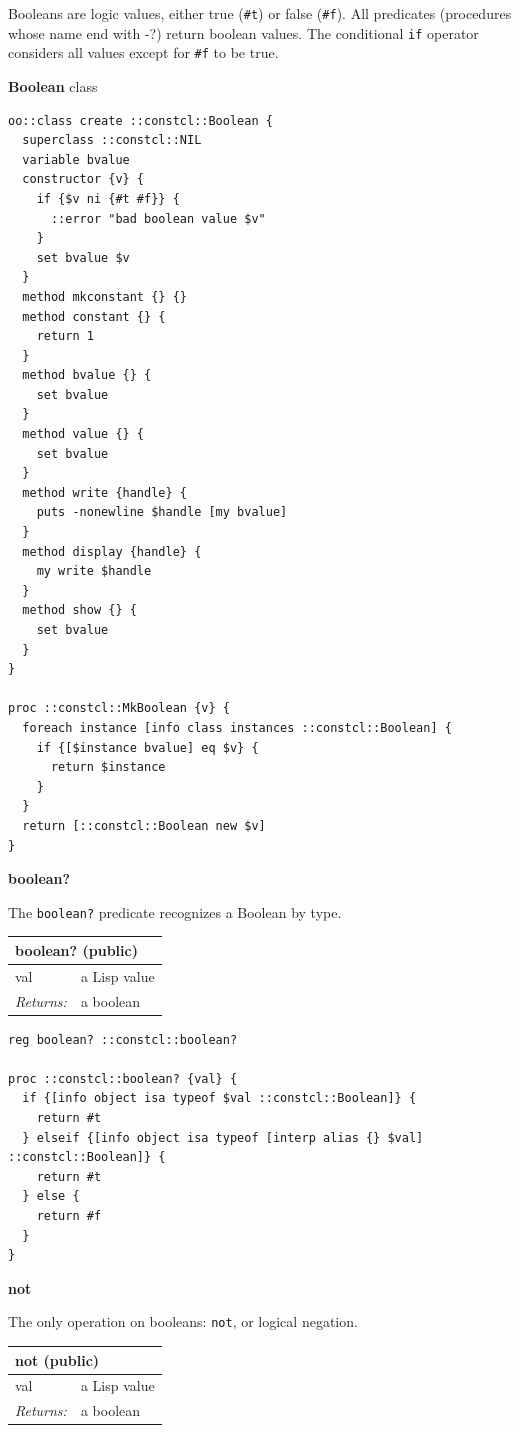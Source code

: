 \documentclass[twoside,9pt]{report}
\begin{document}
Booleans are logic values, either true (\texttt{\#t}) or false (\texttt{\#f}). All predicates (procedures whose name end with -?) return boolean values. The conditional \texttt{if} operator considers all values except for \texttt{\#f} to be true.


\textbf{Boolean} class

\noindent\makebox[\linewidth]{\rule{\linewidth}{0.4pt}}
\begin{lstlisting}
oo::class create ::constcl::Boolean {
  superclass ::constcl::NIL
  variable bvalue
  constructor {v} {
    if {$v ni {#t #f}} {
      ::error "bad boolean value $v"
    }
    set bvalue $v
  }
  method mkconstant {} {}
  method constant {} {
    return 1
  }
  method bvalue {} {
    set bvalue
  }
  method value {} {
    set bvalue
  }
  method write {handle} {
    puts -nonewline $handle [my bvalue]
  }
  method display {handle} {
    my write $handle
  }
  method show {} {
    set bvalue
  }
}
 
proc ::constcl::MkBoolean {v} {
  foreach instance [info class instances ::constcl::Boolean] {
    if {[$instance bvalue] eq $v} {
      return $instance
    }
  }
  return [::constcl::Boolean new $v]
}
\end{lstlisting}
\noindent\makebox[\linewidth]{\rule{\linewidth}{0.4pt}}

\textbf{boolean?}


The \texttt{boolean?} predicate recognizes a Boolean by type.

\begin{tabular}{ |l l| }
\hline
\multicolumn{2}{|l|}{boolean? (public)} \\
\hline
val & a Lisp value \\
\textit{Returns:} & a boolean \\
\hline
\end{tabular}

\noindent\makebox[\linewidth]{\rule{\linewidth}{0.4pt}}
\begin{lstlisting}
reg boolean? ::constcl::boolean?
 
proc ::constcl::boolean? {val} {
  if {[info object isa typeof $val ::constcl::Boolean]} {
    return #t
  } elseif {[info object isa typeof [interp alias {} $val] ::constcl::Boolean]} {
    return #t
  } else {
    return #f
  }
}
\end{lstlisting}
\noindent\makebox[\linewidth]{\rule{\linewidth}{0.4pt}}

\textbf{not}


The only operation on booleans: \texttt{not}, or logical negation.

\begin{tabular}{ |l l| }
\hline
\multicolumn{2}{|l|}{not (public)} \\
\hline
val & a Lisp value \\
\textit{Returns:} & a boolean \\
\hline
\end{tabular}
\end{document}
